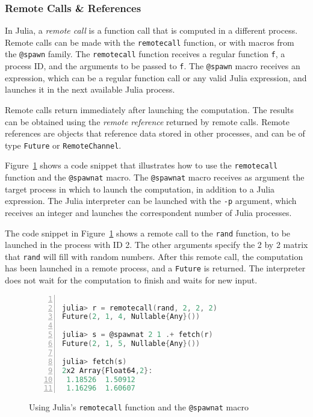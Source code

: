 \subsubsection{Remote Calls \& References}

In Julia, a \textit{remote call} is a function call that is computed in a
different process. Remote calls can be made with the \texttt{remotecall}
function, or with macros from the \texttt{@spawn} family. The
\texttt{remotecall} function receives a regular function \texttt{f}, a process
ID, and the arguments to be passed to \texttt{f}. The \texttt{@spawn} macro
receives an expression, which can be a regular function call or any valid Julia
expression, and launches it in the next available Julia process.

Remote calls return immediately after launching the computation. The
results can be obtained using the \textit{remote reference} returned
by remote calls. Remote references are objects that reference data
stored in other processes, and can be of type \texttt{Future} or
\texttt{RemoteChannel}.

Figure~\ref{fig:remotecall_example} shows a code snippet that illustrates how
to use the \texttt{remotecall} function and the \texttt{@spawnat} macro. The
\texttt{@spawnat} macro receives as argument the target process in which to
launch the computation, in addition to a Julia expression. The Julia
interpreter can be launched with the \texttt{-p} argument, which receives an
integer and launches the correspondent number of Julia processes.

The code snippet in Figure~\ref{fig:remotecall_example} shows a remote call to
the \texttt{rand} function, to be launched in the process with ID 2. The other
arguments specify the 2 by 2 matrix that \texttt{rand} will fill with random
numbers. After this remote call, the computation has been launched in a remote
process, and a \texttt{Future} is returned. The interpreter does not wait for
the computation to finish and waits for new input.

\begin{figure}[htpb]
    \begin{minipage}{\linewidth}
    \begin{lstlisting}[language=C, basicstyle=\ttfamily\scriptsize,
        numbers=left,
        frame=no, showspaces=false, showstringspaces=false,
        numberstyle=\scriptsize,
        xleftmargin=1.5cm,
        keywords={%
            @spawnat, remotecall, Nullable, Any,
            fetch, Future, Array, Float64, julia%
        },
        otherkeywords={::, \&, \*, +, -, /, [, ], >, <}
    ]
% ./julia -p 2

julia> r = remotecall(rand, 2, 2, 2)
Future(2, 1, 4, Nullable{Any}())

julia> s = @spawnat 2 1 .+ fetch(r)
Future(2, 1, 5, Nullable{Any}())

julia> fetch(s)
2x2 Array{Float64,2}:
 1.18526  1.50912
 1.16296  1.60607
    \end{lstlisting}
    \end{minipage}
    \caption{Using Julia's \texttt{remotecall} function and the \texttt{@spawnat} macro}
    \label{fig:remotecall_example}
\end{figure}

